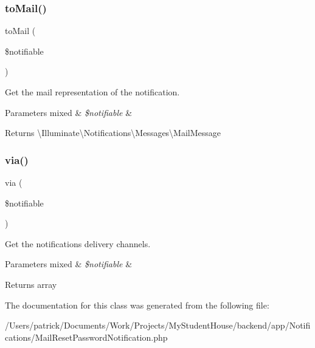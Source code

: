 \subsubsection{\texorpdfstring{toMail()}{toMail()}}
{\footnotesize\ttfamily to\+Mail (\begin{DoxyParamCaption}\item[{}]{\$notifiable }\end{DoxyParamCaption})}

Get the mail representation of the notification.


\begin{DoxyParams}[1]{Parameters}
mixed & {\em \$notifiable} & \\
\hline
\end{DoxyParams}
\begin{DoxyReturn}{Returns}
\textbackslash{}\+Illuminate\textbackslash{}\+Notifications\textbackslash{}\+Messages\textbackslash{}\+Mail\+Message 
\end{DoxyReturn}
\mbox{\label{class_app_1_1_notifications_1_1_mail_reset_password_notification_a7665d00e051513872f2076af10c7af8d}} 
\subsubsection{\texorpdfstring{via()}{via()}}
{\footnotesize\ttfamily via (\begin{DoxyParamCaption}\item[{}]{\$notifiable }\end{DoxyParamCaption})}

Get the notification\textquotesingle{}s delivery channels.


\begin{DoxyParams}[1]{Parameters}
mixed & {\em \$notifiable} & \\
\hline
\end{DoxyParams}
\begin{DoxyReturn}{Returns}
array 
\end{DoxyReturn}


The documentation for this class was generated from the following file\+:\begin{DoxyCompactItemize}
\item 
/\+Users/patrick/\+Documents/\+Work/\+Projects/\+My\+Student\+House/backend/app/\+Notifications/Mail\+Reset\+Password\+Notification.\+php\end{DoxyCompactItemize}
